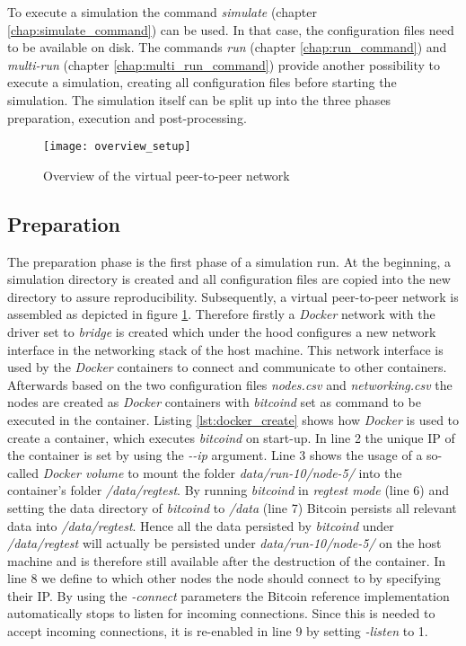 To execute a simulation the command \textit{simulate} (chapter \ref{chap:simulate_command}) can be used.
In that case, the configuration files need to be available on disk.
The commands \textit{run} (chapter \ref{chap:run_command}) and \textit{multi-run} (chapter \ref{chap:multi_run_command}) provide another possibility to execute a simulation, creating all configuration files before starting the simulation.
The simulation itself can be split up into the three phases preparation, execution and post-processing.

\begin{figure}[t]
\texttt{[image: overview\_setup]}
\centering
\caption{Overview of the virtual peer-to-peer network}
\label{fig:overview}
\end{figure}

\subsection{Preparation}

The preparation phase is the first phase of a simulation run.
At the beginning, a simulation directory is created and all configuration files are copied into the new directory to assure reproducibility.
Subsequently, a virtual peer-to-peer network is assembled as depicted in figure \ref{fig:overview}.
Therefore firstly a \textit{Docker} network with the driver set to \textit{bridge} is created which under the hood configures a new network interface in the networking stack of the host machine.
This network interface is used by the \textit{Docker} containers to connect and communicate to other containers.
Afterwards based on the two configuration files \textit{nodes.csv} and \textit{networking.csv} the nodes are created as \textit{Docker} containers with \textit{bitcoind} set as command to be executed in the container.
Listing \ref{lst:docker_create} shows how \textit{Docker} is used to create a container, which executes \textit{bitcoind} on start-up.
In line 2 the unique IP of the container is set by using the \textit{-{}-ip} argument.
Line 3 shows the usage of a so-called \textit{Docker volume} to mount the folder \textit{data/run-10/node-5/} into the container's folder \textit{/data/regtest}.
By running \textit{bitcoind} in \textit{regtest mode} (line 6) and setting the data directory of \textit{bitcoind} to \textit{/data} (line 7) Bitcoin persists all relevant data into \textit{/data/regtest}.
Hence all the data persisted by \textit{bitcoind} under \textit{/data/regtest} will actually be persisted under \textit{data/run-10/node-5/} on the host machine and is therefore still available after the destruction of the container.
In line 8 we define to which other nodes the node should connect to by specifying their IP.
By using the \textit{-connect} parameters the Bitcoin reference implementation automatically stops to listen for incoming connections.
Since this is needed to accept incoming connections, it is re-enabled in line 9 by setting \textit{-listen} to 1.


